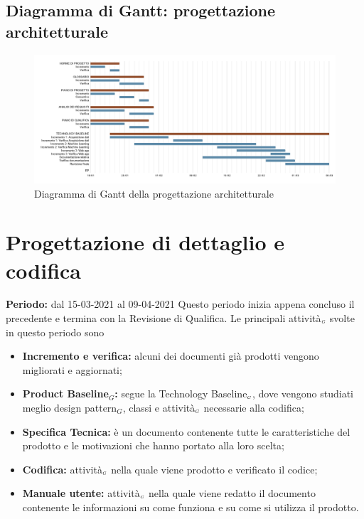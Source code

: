 \subsection{Diagramma di Gantt: progettazione architetturale}\label{PianificazioneDiagrammaDiGanttProgettazioneArchitetturale}
\begin{figure}[h]
	\begin{center}
		\includegraphics[width=0.9\linewidth]{../immagini/pdp/gantt_progettazione_architetturale.png}
		\caption{Diagramma di Gantt della progettazione architetturale}
	\end{center}
\end{figure}
\clearpage
\section{Progettazione di dettaglio e codifica}\label{PianificazioneProgettazioneDettaglio}
\textbf{Periodo:} dal 15-03-2021 al 09-04-2021
Questo periodo inizia appena concluso il precedente e termina con la Revisione di Qualifica.
Le principali attività$_{\scaleto{G}{3pt}}$ svolte in questo periodo sono
\begin{itemize}
	\item \textbf{Incremento e verifica:} alcuni dei documenti già prodotti vengono migliorati e aggiornati;
	\item \textbf{Product Baseline$_G$:} segue la Technology Baseline$_{\scaleto{G}{3pt}}$, dove vengono studiati meglio design pattern$_G$, classi e attività$_{\scaleto{G}{3pt}}$ necessarie alla codifica;
	\item \textbf{Specifica Tecnica:} è un documento contenente tutte le caratteristiche del prodotto e le motivazioni che hanno portato alla loro scelta;
	\item \textbf{Codifica:} attività$_{\scaleto{G}{3pt}}$ nella quale viene prodotto e verificato il codice;
	\item \textbf{Manuale utente:} attività$_{\scaleto{G}{3pt}}$ nella quale viene redatto il documento contenente le informazioni su come funziona e su come si utilizza il prodotto.
\end{itemize}
